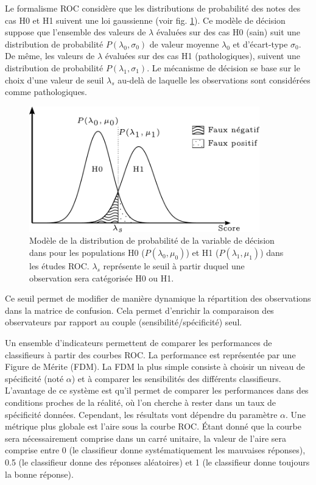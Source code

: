 Le formalisme ROC considère que les distributions de probabilité des notes des cas H0 et H1 suivent une loi gaussienne (voir fig. \ref{fig:loiROC}). Ce modèle de décision suppose que l'ensemble des valeurs de $\lambda$ évaluées sur des cas H0 (sain) suit une distribution de probabilité $P(\lambda_0, \sigma_0)$ de valeur moyenne $\lambda_0$ et d'écart-type $\sigma_0$. De même, les valeurs de $\lambda$ évaluées sur des cas H1 (pathologiques), suivent une distribution de probabilité $P(\lambda_1, \sigma_1)$. Le mécanisme de décision se base sur le choix d'une valeur de seuil $\lambda_s$ au-delà de laquelle les observations sont considérées comme pathologiques.

\begin{figure}[h]
	
	\label{fig:loiROC}
	\begin{center}
	\includegraphics[width=10cm]{images/loiROC}
	\vspace{-0.5cm} %
	\end{center}
	\caption{Modèle de la distribution de probabilité de la variable de décision dans pour les populations H0 ($P(\lambda_0, \mu_0)$) et H1 ($P(\lambda_1, \mu_1)$) dans les études ROC. $\lambda_s$ représente le seuil à partir duquel une observation sera catégorisée H0 ou H1.}
\end{figure}

Ce seuil permet de modifier de manière dynamique la répartition des observations dans la matrice de confusion.  Cela permet d'enrichir la comparaison des observateurs par rapport au couple (sensibilité/spécificité) seul.


Un ensemble d'indicateurs permettent de comparer les performances de classifieurs à partir des courbes ROC. La performance est représentée par une Figure de Mérite (FDM). La FDM la plus simple consiste à choisir un niveau de spécificité (noté $\alpha$) et à comparer les sensibilités des différents classifieurs. L'avantage de ce système est qu'il permet de comparer les performances dans des conditions proches de la réalité, où l'on cherche à rester dans un taux de spécificité données. Cependant, les résultats vont dépendre du paramètre $\alpha$. Une métrique plus globale est l'aire sous la courbe ROC. \'Etant donné que la courbe sera nécessairement comprise dans un carré unitaire, la valeur de l'aire sera comprise entre 0 (le classifieur donne systématiquement les mauvaises réponses), 0.5 (le classifieur donne des réponses aléatoires) et 1 (le classifieur donne toujours la bonne réponse)\cite{nie2006integrating}.

